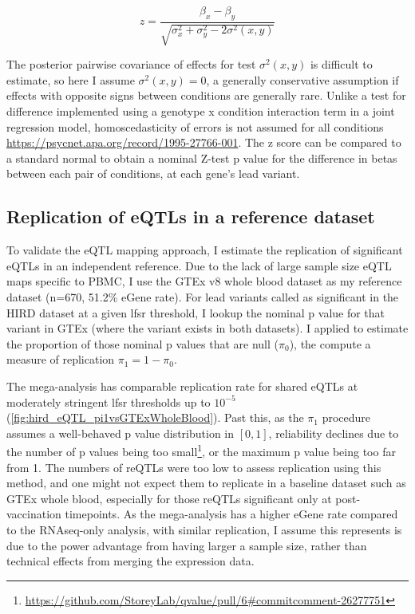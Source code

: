 \begin{equation}
z = \frac{\beta_x - \beta_y}{\sqrt{\sigma_x^2 + \sigma_y^2 - 2\sigma^2(x, y)}}
\end{equation}

The posterior pairwise covariance of effects for test $\sigma^2(x, y)$ is difficult to estimate, so here I assume $\sigma^2(x, y) = 0$, a generally conservative assumption if effects with opposite signs between conditions are generally rare.
Unlike a test for difference implemented using a genotype x condition interaction term in a joint regression model, homoscedasticity of errors is not assumed for all conditions \url{https://psycnet.apa.org/record/1995-27766-001}.
The z score can be compared to a standard normal to obtain a nominal Z-test p value for the difference in betas between each pair of conditions, at each gene's lead variant.

\subsection{Replication of eQTLs in a reference dataset}

To validate the \gls{eQTL} mapping approach, I estimate the replication of significant eQTLs in an independent reference.
Due to the lack of large sample size \gls{eQTL} maps specific to \gls{PBMC}, I use the GTEx v8 whole blood dataset as my reference dataset (n=670, 51.2\% eGene rate).
For lead variants called as significant in the \gls{HIRD} dataset at a given lfsr threshold, I lookup the nominal p value for that variant in GTEx (where the variant exists in both datasets).
I applied  to estimate the proportion of those nominal p values that are null ($\pi_0$), the compute a measure of replication $\pi_1 = 1 - \pi_0$.

The mega-analysis has comparable replication rate for shared \glspl{eQTL} at moderately stringent \gls{lfsr} thresholds up to $10^{-5}$ (\autoref{fig:hird_eQTL_pi1vsGTExWholeBlood}).
Past this, as the $\pi_1$ procedure assumes a well-behaved p value distribution in $\left[0, 1\right]$, reliability declines due to the number of p values being too small\footnote{\url{https://github.com/StoreyLab/qvalue/pull/6\#commitcomment-26277751}}, or the maximum p value being too far from 1.
The numbers of \glspl{reQTL} were too low to assess replication using this method, and one might not expect them to replicate in a baseline dataset such as GTEx whole blood, especially for those \glspl{reQTL} significant only at post-vaccination timepoints.
As the mega-analysis has a higher eGene rate  compared to the \gls{RNAseq}-only analysis, with similar replication,
I assume this represents is due to the power advantage from having larger a sample size, rather than technical effects from merging the expression data.

